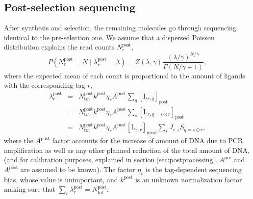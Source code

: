 \documentclass[letter,10pt,oneside]{article}
\newcommand{\bel}{\begin{equation}}
\newcommand{\eel}{\end{equation}}
\newcommand{\bal}{\begin{eqnarray}}
\newcommand{\eal}{\end{eqnarray}}
\newcommand{\+}{^\dagger}
\begin{document}
\subsection{Post-selection sequencing}

After synthesis and selection, the remaining molecules go through sequencing  identical to the pre-selection one. We assume that a dispersed Poisson distribution explains the read counts $N^\text{post}_r$, 
\bel
  \label{eq:dispersered-Poisson_post}
  P(N^\text{post}_r = N \;|\; \lambda^\text{post}_r = \lambda) = Z(\lambda, \gamma) \frac{(\lambda / \gamma)^{N/\gamma}}{\Gamma(N/\gamma + 1)},
\eel
where the expected mean of each count is proportional to the amount of ligands with the corresponding tag $r$,
\bal
  \lambda_r^\text{post} &=& N_\text{tot}^\text{post} k^\text{post} \eta_r A^\text{post}\sum_q [\text{L}_{r,q}]_\text{post}   \\
  &=& N_\text{tot}^\text{post} k^\text{post} \eta_r A^\text{post}\sum_s [\text{L}_{r,q = s\odot r}]_\text{post} \\
  \label{eq:lambda_r_post}
  &=& N_\text{tot}^\text{post} k^\text{post} \eta_r A^\text{post}[\text{L}_{r,r}]_\text{ideal} \sum_s  J_{r,s} S_{q=s\odot r},
\eal
where the $A^\text{post}$ factor accounts for the increase of amount of DNA due to PCR amplification as well as any other planned reduction of the total amount of DNA, (and for calibration purposes, explained in section \ref{sec:postprocessing}, $A^\text{pre}$ and $A^\text{post}$ are assumed to be known). The factor $\eta_r$ is the tag-dependent sequencing bias, whose value is unimportant, and $k^\text{post}$ is an unknown normalization factor making sure that $\sum_r\lambda_r^\text{post} = N_\text{tot}^\text{post}$.
\end{document}
